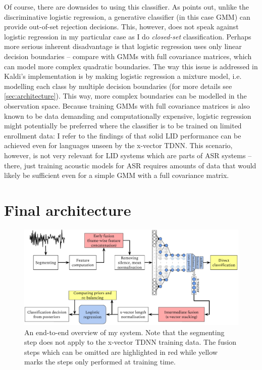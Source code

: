 \documentclass[bsc,frontabs,twoside,singlespacing,parskip,deptreport]{infthesis}
\begin{document}
{{    %
    Of course, there are downsides to using this classifier. As \citet{McCree_2014} points out, unlike the discriminative logistic regression, a generative classifier (in this case GMM) can provide out-of-set rejection decisions. This, however, does not speak against logistic regression in my particular case as I do \textit{closed-set} classification. Perhaps more serious inherent disadvantage is that logistic regression uses only linear decision boundaries -- compare with GMMs with full covariance matrices, which can model more complex quadratic boundaries. The way this issue is addressed in Kaldi's implementation is by making logistic regression a mixture model, i.e. modelling each class by multiple decision boundaries (for more details see \autoref{sec:architecture}). This way, more complex boundaries can be modelled in the observation space. Because training GMMs with full covariance matrices is also known to be data demanding and computationally expensive, logistic regression might potentially be preferred where the classifier is to be trained on limited enrollment data: I refer to the findings of \citeauthor{Snyder_et_al_2018} that solid LID performance can be achieved even for languages unseen by the x-vector TDNN. This scenario, however, is not very relevant for LID systems which are parts of ASR systems -- there, just training acoustic models for ASR requires amounts of data that would likely be sufficient even for a simple GMM with a full covariance matrix.
  }

  \section{Final architecture}{
    \label{sec:architecture}

    \begin{figure}[h!t]
      \centering
      \includegraphics[width=15cm]{graphics/architecture}
      \vspace*{-1em}
      \caption{An end-to-end overview of my system. Note that the segmenting step does not apply to the x-vector TDNN training data. The fusion steps which can be omitted are highlighted in red while yellow marks the steps only performed at training time.}
      \label{fig:architecture}
    \end{figure}

}}
\end{document}
